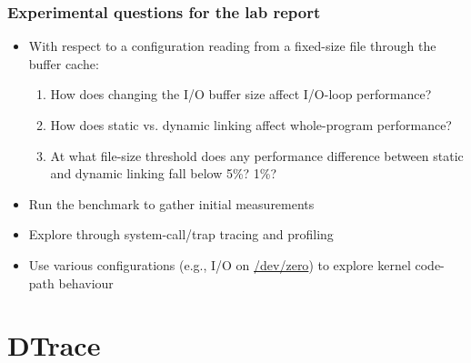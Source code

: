 \begin{frame}
  \frametitle{Experimental questions for the lab report}

  \begin{itemize}
    \item With respect to a configuration reading from a fixed-size file
      through the buffer cache:
    \begin{enumerate}
      \item How does changing the I/O buffer size affect I/O-loop performance?
      \item How does static vs. dynamic linking affect whole-program
	performance?
      \item At what file-size threshold does any performance difference
	between static and dynamic linking fall below 5\%? 1\%?
    \end{enumerate}

    \pause
    \bigskip

    \item Run the benchmark to gather initial measurements
    \item Explore through system-call/trap tracing and profiling
    \item Use various configurations (e.g., I/O on \url{/dev/zero}) to explore
      kernel code-path behaviour
  \end{itemize}
\end{frame}

\section{DTrace}

